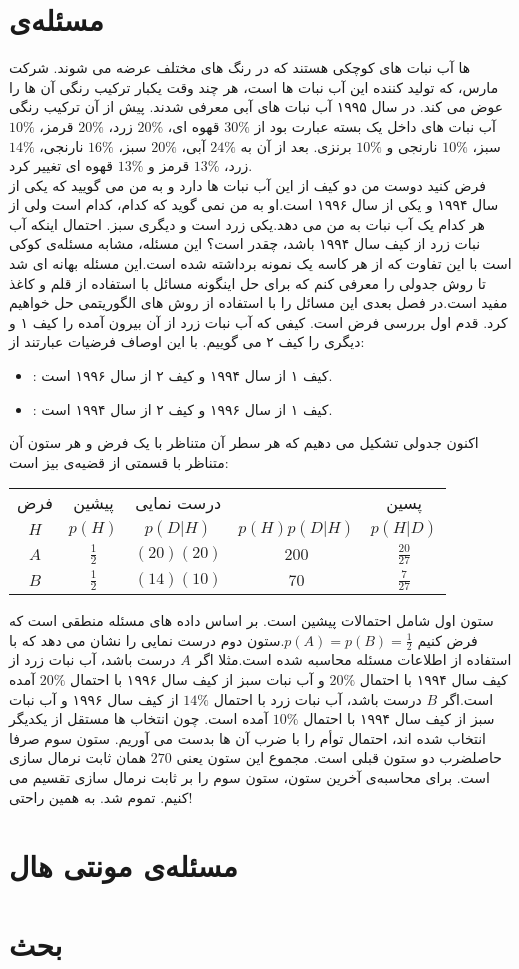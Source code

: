 \section{مسئله‌ی }

 ها آب نبات های کوچکی هستند که در رنگ های مختلف عرضه می شوند. شرکت مارس، که تولید کننده این آب نبات ها است، هر چند وقت یکبار ترکیب رنگی آن ها را عوض می کند. در سال ۱۹۹۵ آب نبات های آبی معرفی شدند. پیش از آن ترکیب رنگی آب نبات های داخل یک بسته عبارت بود از $30\%$  قهوه ای، $20\%$ زرد، $20\%$ قرمز، $10\%$ سبز، $10\%$ نارنجی و $10\%$ برنزی. بعد از آن به $24\%$ آبی، $20\%$ سبز، $16\%$ نارنجی، $14\%$ زرد، $13\%$ قرمز و $13\%$ قهوه ای تغییر کرد.\\
فرض کنید دوست من دو کیف از این آب نبات ها دارد و به من می گویید که یکی از سال ۱۹۹۴ و یکی از سال ۱۹۹۶ است.او به من نمی گوید که کدام، کدام است ولی از هر کدام یک آب نبات به من می دهد.یکی زرد است و دیگری سبز. احتمال اینکه آب نبات زرد از کیف سال ۱۹۹۴ باشد، چقدر است؟
این مسئله، مشابه مسئله‌ی کوکی است با این تفاوت که از هر کاسه یک نمونه برداشته شده است.این مسئله بهانه ای شد تا روش جدولی را معرفی کنم که برای حل اینگونه مسائل با استفاده از قلم و کاغذ مفید است.در فصل بعدی این مسائل را با استفاده از روش های الگوریتمی حل خواهیم کرد.
قدم اول بررسی فرض است. کیفی که آب نبات زرد از آن بیرون آمده را کیف ۱ و  دیگری را کیف ۲ می گوییم. با این اوصاف فرضیات عبارتند از:
\begin{itemize}
\item {} : کیف ۱ از سال ۱۹۹۴ و کیف ۲ از سال ۱۹۹۶ است.
\item {} : کیف ۱ از سال ۱۹۹۶ و کیف ۲ از سال ۱۹۹۴ است.
\end{itemize}

اکنون جدولی تشکیل می دهیم که هر سطر آن متناظر با یک فرض و هر ستون آن متناظر با قسمتی از قضیه‌ی بیز است:


\begin{center}
\begin{tabular}{ |c|c|c|c|c| } 
 \hline
 فرض & پیشین & درست نمایی &  & پسین \\
 $H$ & $p(H)$ & $p(D|H)$ & $p(H)p(D|H)$ & $p(H|D)$ \\
 \hline
 $A$ & $\frac{1}{2}$ & $(20)(20)$ & $200$ & $\frac{20}{27}$ \\ 
 \hline
 $B$ & $\frac{1}{2}$ & $(14)(10)$ & $70$ & $\frac{7}{27}$ \\ 
 \hline
\end{tabular}
\end{center}
ستون اول شامل احتمالات پیشین است. بر اساس داده های مسئله منطقی است که فرض کنیم $p(A) = p(B) = \frac{1}{2}$.ستون دوم درست نمایی را نشان می دهد که با استفاده از اطلاعات مسئله محاسبه شده است.مثلا اگر $A$ درست باشد، آب نبات زرد از کیف سال ۱۹۹۴ با احتمال $20\%$ و آب نبات سبز از کیف سال ۱۹۹۶ با احتمال $20\%$ آمده است.اگر $B$ درست باشد، آب نبات زرد با احتمال $14\%$ از کیف سال ۱۹۹۶ و آب نبات سبز از کیف سال ۱۹۹۴ با احتمال $10\%$ آمده است. چون انتخاب ها مستقل از یکدیگر انتخاب شده اند، احتمال توأم را با ضرب آن ها بدست می آوریم. ستون سوم صرفا حاصلضرب دو ستون قبلی است. مجموع این ستون یعنی $270$ همان ثابت نرمال سازی است. برای محاسبه‌ی آخرین ستون، ستون سوم را بر ثابت نرمال سازی تقسیم می کنیم. تموم شد. به همین راحتی! 
\section{مسئله‌ی مونتی هال}

\section{بحث}


